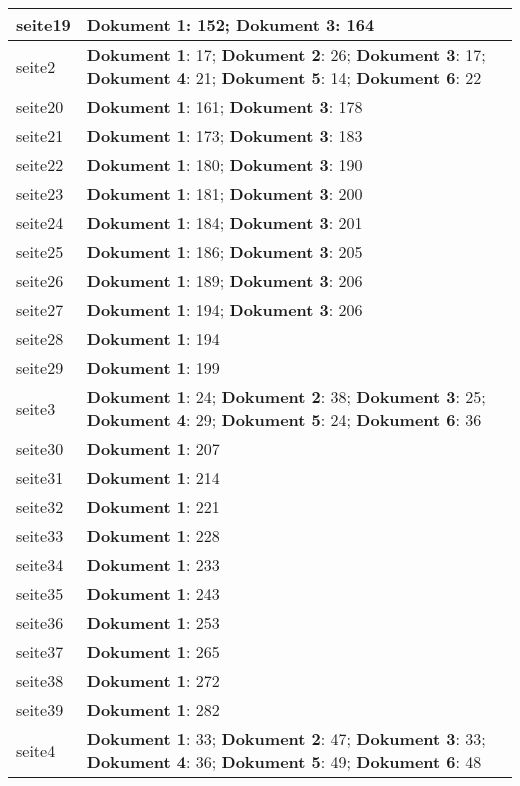 \documentclass[a5paper]{article}
\begin{document}
\begin{longtable}[l]{|l|p{3in}|}
seite19 & \textbf{Dokument 1}: 152; \textbf{Dokument 3}: 164 \\
\hline
seite2 & \textbf{Dokument 1}: 17; \textbf{Dokument 2}: 26; \textbf{Dokument 3}: 17; \textbf{Dokument 4}: 21; \textbf{Dokument 5}: 14; \textbf{Dokument 6}: 22 \\
\hline
seite20 & \textbf{Dokument 1}: 161; \textbf{Dokument 3}: 178 \\
\hline
seite21 & \textbf{Dokument 1}: 173; \textbf{Dokument 3}: 183 \\
\hline
seite22 & \textbf{Dokument 1}: 180; \textbf{Dokument 3}: 190 \\
\hline
seite23 & \textbf{Dokument 1}: 181; \textbf{Dokument 3}: 200 \\
\hline
seite24 & \textbf{Dokument 1}: 184; \textbf{Dokument 3}: 201 \\
\hline
seite25 & \textbf{Dokument 1}: 186; \textbf{Dokument 3}: 205 \\
\hline
seite26 & \textbf{Dokument 1}: 189; \textbf{Dokument 3}: 206 \\
\hline
seite27 & \textbf{Dokument 1}: 194; \textbf{Dokument 3}: 206 \\
\hline
seite28 & \textbf{Dokument 1}: 194 \\
\hline
seite29 & \textbf{Dokument 1}: 199 \\
\hline
seite3 & \textbf{Dokument 1}: 24; \textbf{Dokument 2}: 38; \textbf{Dokument 3}: 25; \textbf{Dokument 4}: 29; \textbf{Dokument 5}: 24; \textbf{Dokument 6}: 36 \\
\hline
seite30 & \textbf{Dokument 1}: 207 \\
\hline
seite31 & \textbf{Dokument 1}: 214 \\
\hline
seite32 & \textbf{Dokument 1}: 221 \\
\hline
seite33 & \textbf{Dokument 1}: 228 \\
\hline
seite34 & \textbf{Dokument 1}: 233 \\
\hline
seite35 & \textbf{Dokument 1}: 243 \\
\hline
seite36 & \textbf{Dokument 1}: 253 \\
\hline
seite37 & \textbf{Dokument 1}: 265 \\
\hline
seite38 & \textbf{Dokument 1}: 272 \\
\hline
seite39 & \textbf{Dokument 1}: 282 \\
\hline
seite4 & \textbf{Dokument 1}: 33; \textbf{Dokument 2}: 47; \textbf{Dokument 3}: 33; \textbf{Dokument 4}: 36; \textbf{Dokument 5}: 49; \textbf{Dokument 6}: 48 \\

\end{longtable}
\end{document}
